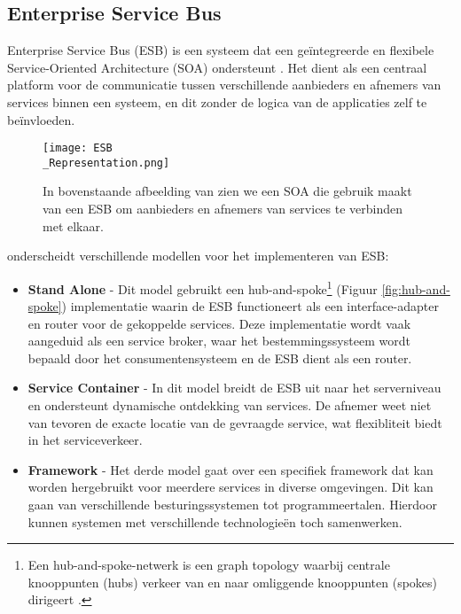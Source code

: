 \subsection{Enterprise Service Bus}
\label{sec:ESB}

Enterprise Service Bus (ESB) is een systeem dat een geïntegreerde en flexibele Service-Oriented Architecture (SOA) ondersteunt \autocite{Gaol2023}. Het dient als een centraal platform voor de communicatie tussen verschillende aanbieders en afnemers van services binnen een systeem, en dit zonder de logica van de applicaties zelf te beïnvloeden.\newline

\begin{figure}[H]
	\centering
	\texttt{[image: ESB\\\_Representation.png]}
	\caption[Voorstelling van een Enterprise-Service Bus]{\label{fig:ESB_Representation}In bovenstaande afbeelding van \textcite{Megargel2021} zien we een  SOA die gebruik maakt van een ESB om aanbieders en afnemers van services te verbinden met elkaar.}
\end{figure}

\textcite{Gaol2023} onderscheidt verschillende modellen voor het implementeren van ESB:

\begin{itemize}
	\item \textbf{Stand Alone} - Dit model gebruikt een hub-and-spoke\footnote{Een hub-and-spoke-netwerk is een graph topology waarbij centrale knooppunten (hubs) verkeer van en naar omliggende knooppunten (spokes) dirigeert \autocite{Khosravi2024}.} (Figuur \ref{fig:hub-and-spoke}) implementatie waarin de ESB functioneert als een interface-adapter en router voor de gekoppelde services. Deze implementatie wordt vaak aangeduid als een service broker, waar het bestemmingssysteem wordt bepaald door het consumentensysteem en de ESB dient als een router.
	\item \textbf{Service Container} - In dit model breidt de ESB uit naar het serverniveau en ondersteunt dynamische ontdekking van services. De afnemer weet niet van tevoren de exacte locatie van de gevraagde service, wat flexibliteit biedt in het serviceverkeer.
	\item \textbf{Framework} - Het derde model gaat over een specifiek framework dat kan worden hergebruikt voor meerdere services in diverse omgevingen. Dit kan gaan van verschillende besturingssystemen tot programmeertalen. Hierdoor kunnen systemen met verschillende technologieën toch samenwerken.
\end{itemize}

